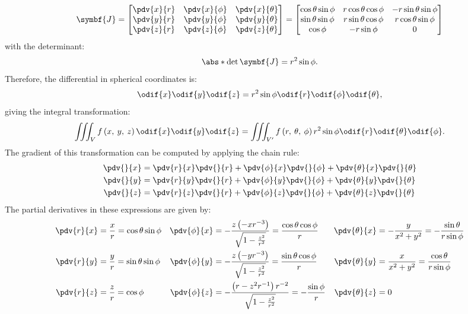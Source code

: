 \documentclass{article}
\begin{document}
\begin{equation*}
    \symbf{J} =
    \begin{bmatrix}
        \displaystyle\pdv{x}{r} & \displaystyle\pdv{x}{\phi} & \displaystyle\pdv{x}{\theta} \\
        \displaystyle\pdv{y}{r} & \displaystyle\pdv{y}{\phi} & \displaystyle\pdv{y}{\theta} \\
        \displaystyle\pdv{z}{r} & \displaystyle\pdv{z}{\phi} & \displaystyle\pdv{z}{\theta}
    \end{bmatrix}
    =
    \begin{bmatrix}
        \cos{\theta} \sin{\phi} & r \cos{\theta} \cos{\phi} & -r \sin{\theta} \sin{\phi} \\
        \sin{\theta} \sin{\phi} & r \sin{\theta} \cos{\phi} & r \cos{\theta} \sin{\phi}  \\
        \cos{\phi}              & -r \sin{\phi}             & 0
    \end{bmatrix}
\end{equation*}
with the determinant:
\begin{equation*}
    \abs*{\det{\symbf{J}}} = r^2 \sin{\phi}.
\end{equation*}
Therefore, the differential in spherical coordinates is:
\begin{equation*}
    \odif{x} \odif{y} \odif{z} = r^2 \sin{\phi} \odif{r} \odif{\phi} \odif{\theta},
\end{equation*}
giving the integral transformation:
\begin{equation*}
    \iiint_{V} f\left( x, \: y, \: z \right) \odif{x} \odif{y} \odif{z} = \iiint_{V'} f\left( r, \: \theta, \: \phi \right) r^2 \sin{\phi} \odif{r} \odif{\theta} \odif{\phi}.
\end{equation*}
The gradient of this transformation can be computed by applying the
chain rule:
\begin{align*}
    \pdv{}{x} & = \pdv{r}{x} \pdv{}{r} + \pdv{\phi}{x} \pdv{}{\phi} + \pdv{\theta}{x} \pdv{}{\theta} \\
    \pdv{}{y} & = \pdv{r}{y} \pdv{}{r} + \pdv{\phi}{y} \pdv{}{\phi} + \pdv{\theta}{y} \pdv{}{\theta} \\
    \pdv{}{z} & = \pdv{r}{z} \pdv{}{r} + \pdv{\phi}{z} \pdv{}{\phi} + \pdv{\theta}{z} \pdv{}{\theta}
\end{align*}
The partial derivatives in these expressions are given by:
\begin{align*}
    \pdv{r}{x} & = \frac{x}{r} = \cos{\theta} \sin{\phi} & \pdv{\phi}{x} & = -\frac{z\left( - x r^{-3} \right)}{\sqrt{1 - \frac{z^2}{r^2}}} = \frac{\cos{\theta}\cos{\phi}}{r} & \pdv{\theta}{x} & = -\frac{y}{x^2 + y^2} = -\frac{\sin{\theta}}{r \sin{\phi}} \\
    \pdv{r}{y} & = \frac{y}{r} = \sin{\theta} \sin{\phi} & \pdv{\phi}{y} & = -\frac{z\left( - y r^{-3} \right)}{\sqrt{1 - \frac{z^2}{r^2}}} = \frac{\sin{\theta}\cos{\phi}}{r} & \pdv{\theta}{y} & = \frac{x}{x^2 + y^2} = \frac{\cos{\theta}}{r \sin{\phi}}   \\
    \pdv{r}{z} & = \frac{z}{r} = \cos{\phi}              & \pdv{\phi}{z} & = -\frac{\left( r - z^2r^{-1} \right)r^{-2}}{\sqrt{1 - \frac{z^2}{r^2}}} = -\frac{\sin{\phi}}{r}    & \pdv{\theta}{z} & = 0
\end{align*}
\end{document}
